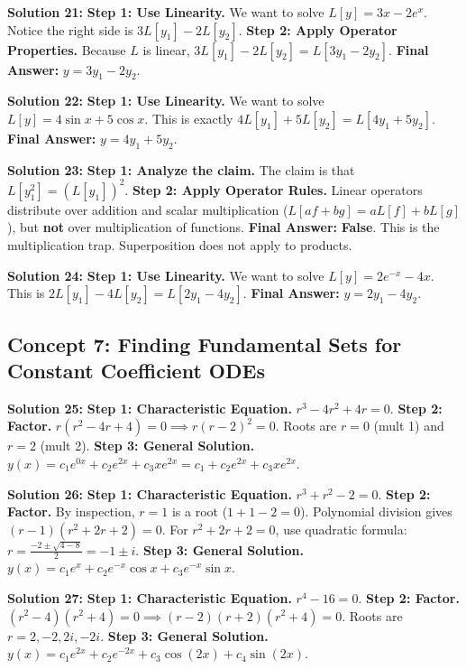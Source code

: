 \documentclass[12pt]{article}
\begin{document}
\textbf{Solution 21:}
\textbf{Step 1: Use Linearity.} We want to solve $L[y] = 3x - 2e^x$.
Notice the right side is $3L[y_1] - 2L[y_2]$.
\textbf{Step 2: Apply Operator Properties.} Because $L$ is linear, $3L[y_1] - 2L[y_2] = L[3y_1 - 2y_2]$.
\textbf{Final Answer:} $y = 3y_1 - 2y_2$.

\textbf{Solution 22:}
\textbf{Step 1: Use Linearity.} We want to solve $L[y] = 4\sin x + 5\cos x$.
This is exactly $4L[y_1] + 5L[y_2] = L[4y_1 + 5y_2]$.
\textbf{Final Answer:} $y = 4y_1 + 5y_2$.

\textbf{Solution 23:}
\textbf{Step 1: Analyze the claim.} The claim is that $L[y_1^2] = (L[y_1])^2$.
\textbf{Step 2: Apply Operator Rules.} Linear operators distribute over addition and scalar multiplication ($L[af+bg] = aL[f]+bL[g]$), but \textbf{not} over multiplication of functions.
\textbf{Final Answer:} \textbf{False}. This is the multiplication trap. Superposition does not apply to products.

\textbf{Solution 24:}
\textbf{Step 1: Use Linearity.} We want to solve $L[y] = 2e^{-x} - 4x$.
This is $2L[y_1] - 4L[y_2] = L[2y_1 - 4y_2]$.
\textbf{Final Answer:} $y = 2y_1 - 4y_2$.

\subsection*{Concept 7: Finding Fundamental Sets for Constant Coefficient ODEs}

\textbf{Solution 25:}
\textbf{Step 1: Characteristic Equation.} $r^3 - 4r^2 + 4r = 0$.
\textbf{Step 2: Factor.} $r(r^2 - 4r + 4) = 0 \implies r(r-2)^2 = 0$.
Roots are $r=0$ (mult 1) and $r=2$ (mult 2).
\textbf{Step 3: General Solution.} $y(x) = c_1e^{0x} + c_2e^{2x} + c_3xe^{2x} = c_1 + c_2e^{2x} + c_3xe^{2x}$.

\textbf{Solution 26:}
\textbf{Step 1: Characteristic Equation.} $r^3 + r^2 - 2 = 0$.
\textbf{Step 2: Factor.} By inspection, $r=1$ is a root ($1+1-2=0$).
Polynomial division gives $(r-1)(r^2 + 2r + 2) = 0$.
For $r^2+2r+2=0$, use quadratic formula: $r = \frac{-2 \pm \sqrt{4 - 8}}{2} = -1 \pm i$.
\textbf{Step 3: General Solution.} $y(x) = c_1e^x + c_2e^{-x}\cos x + c_3e^{-x}\sin x$.

\textbf{Solution 27:}
\textbf{Step 1: Characteristic Equation.} $r^4 - 16 = 0$.
\textbf{Step 2: Factor.} $(r^2 - 4)(r^2 + 4) = 0 \implies (r-2)(r+2)(r^2+4) = 0$.
Roots are $r=2, -2, 2i, -2i$.
\textbf{Step 3: General Solution.} $y(x) = c_1e^{2x} + c_2e^{-2x} + c_3\cos(2x) + c_4\sin(2x)$.
\end{document}
